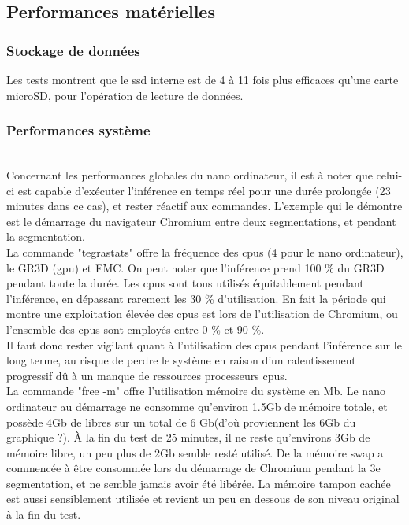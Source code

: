 ﻿\subsection{Performances matérielles}
\subsubsection{Stockage de données}
\noindent Les tests montrent que le \acrshort{ssd} interne est de 4 à 11 fois plus efficaces qu'une carte microSD, pour l'opération de lecture de données. 
\subsubsection{Performances système}
\vspace{\baselineskip}
\\
\noindent Concernant les performances globales du nano ordinateur, il est à noter que celui-ci est capable d'exécuter l'inférence en temps réel pour une durée prolongée (23 minutes dans ce cas), et rester réactif aux commandes. L'exemple qui le démontre est le démarrage du navigateur Chromium entre deux segmentations, et pendant la segmentation.
\vspace{\baselineskip}
\\
\noindent La commande "tegrastats" offre la fréquence des \acrshort{cpu}s (4 pour le nano ordinateur), le GR3D (\acrshort{gpu}) et EMC. On peut noter que l'inférence prend 100 \% du GR3D pendant toute la durée. Les \acrshort{cpu}s sont tous utilisés équitablement pendant l'inférence, en dépassant rarement les 30 \% d'utilisation. En fait la période qui montre une exploitation élevée des \acrshort{cpu}s est lors de l'utilisation de Chromium, ou l'ensemble des \acrshort{cpu}s sont employés entre 0 \% et 90 \%. 
\vspace{\baselineskip}
\\
\noindent Il faut donc rester vigilant quant à l'utilisation des \acrshort{cpu}s pendant l'inférence sur le long terme, au risque de perdre le système en raison d'un ralentissement progressif dû à un manque de ressources processeurs \acrshort{cpu}s.
\vspace{\baselineskip}
\\
\noindent La commande "free -m" offre l'utilisation mémoire du système en Mb. Le nano ordinateur au démarrage ne consomme qu'environ 1.5Gb de mémoire totale, et possède 4Gb de libres sur un total de 6 Gb(d'où proviennent les 6Gb du graphique ?). À la fin du test de 25 minutes, il ne reste qu'environs 3Gb de mémoire libre, un peu plus de 2Gb semble resté utilisé. De la mémoire swap a commencée à être consommée lors du démarrage de Chromium pendant la 3e segmentation, et ne semble jamais avoir été libérée. La mémoire tampon cachée est aussi sensiblement utilisée et revient un peu en dessous de son niveau original à la fin du test. 
